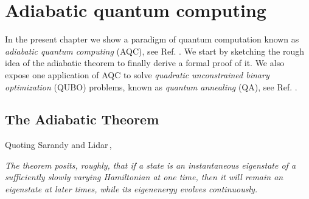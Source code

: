 
\chapter{Adiabatic quantum computing} %

\label{Chapter2} %
In the present chapter we show a paradigm of quantum computation known as \textit{adiabatic quantum computing} (AQC), see Ref. \cite{Farhi2000QuantumEvolution}. We start by sketching the rough idea of the adiabatic theorem to finally derive a formal proof of it. We also expose one application of AQC to solve \textit{quadratic unconstrained binary optimization} (QUBO) problems, known as \textit{quantum annealing} (QA), see Ref. \cite{Kadowaki1998QuantumModel}.

\section{The Adiabatic Theorem}
Quoting Sarandy and Lidar\,\cite{Sarandy2005AdiabaticSystems},
\begin{displayquote}
\textit{The theorem posits, roughly, that if a state is an instantaneous eigenstate of a sufficiently slowly varying Hamiltonian at one time, then it will remain an eigenstate at later times, while its eigenenergy evolves continuously.}
\end{displayquote}
